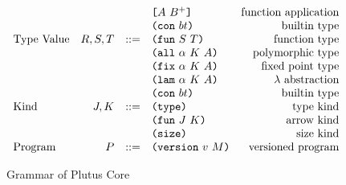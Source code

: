 \documentclass[../main.tex]{subfiles}
\begin{document}
\begin{figure*}[t]
\[\begin{array}{lrclr}
                                  &        &     & \texttt{[} A ~ B^+ \texttt{]}              & \textrm{function application}\\
                                  &        &     & \texttt{(} \texttt{con} ~ bt \texttt{)}                  & \textrm{builtin type}\\
        \textrm{Type Value}       & R,S,T  & ::= & \texttt{(} \texttt{fun} ~ S ~ T \texttt{)}                & \textrm{function type}\\
                                  &        &     & \texttt{(} \texttt{all} ~ \alpha ~ K ~ A \texttt{)}        & \textrm{polymorphic type}\\
                                  &        &     & \texttt{(} \texttt{fix} ~ \alpha ~ K ~ A \texttt{)}        & \textrm{fixed point type}\\
                                  &        &     & \texttt{(} \texttt{lam} ~ \alpha ~ K ~ A \texttt{)}        & \textrm{$\lambda$ abstraction}\\
                                  &        &     & \texttt{(} \texttt{con} ~ bt \texttt{)}                  & \textrm{builtin type}\\
        \textrm{Kind}             & J,K    & ::= & \texttt{(} \texttt{type} \texttt{)}{}                   & \textrm{type kind}\\
                                  &        &     & \texttt{(} \texttt{fun} ~ J ~ K \texttt{)}                & \textrm{arrow kind}\\
                                  &        &     & \texttt{(} \texttt{size} \texttt{)}{}                   & \textrm{size kind}\\
        \textrm{Program}          & P      & ::= & \texttt{(} \texttt{version} ~ v ~ M \texttt{)}             & \textrm{versioned program}\\

    \end{array}\]
    \caption{Grammar of Plutus Core}
    \label{fig:Plutus_core_grammar}
\end{figure*}
\end{document}
